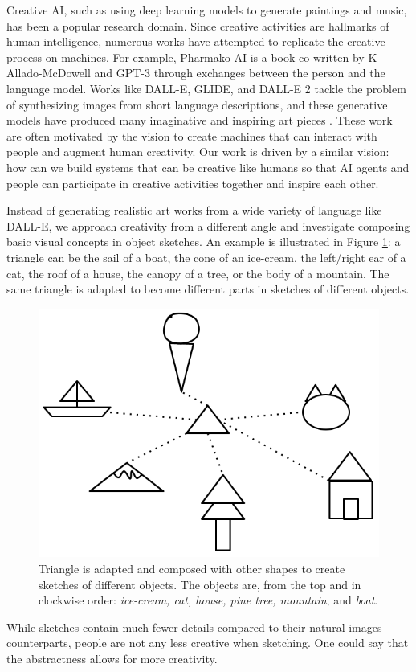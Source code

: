 Creative AI, such as using deep learning models to generate paintings and music, has been a popular research domain.
Since creative activities are hallmarks of human intelligence, numerous works have attempted to replicate the creative process on machines.
For example, Pharmako-AI \citep{allado-mcdowell_okojie_2020} is a book co-written by K Allado-McDowell and GPT-3 \citep{gpt3} through exchanges between the person and the language model. 
Works like DALL-E, GLIDE, and DALL-E 2 tackle the problem of synthesizing images from short language descriptions, and these generative models have produced many imaginative and inspiring art pieces \citep{dallePaper,glidePaper,dalle2Paper}.
These work are often motivated by the vision to create machines that can interact with people and augment human creativity.  
Our work is driven by a similar vision: how can we build systems that can be creative like humans so that AI agents and people can participate in creative activities together and inspire each other. 

Instead of generating realistic art works from a wide variety of language like DALL-E, we approach creativity from a different angle and investigate composing basic visual concepts in object sketches.
An example is illustrated in Figure \ref{introduction.composition}: a triangle can be the sail of a boat, the cone of an ice-cream, the left/right ear of a cat, the roof of a house, the canopy of a tree, or the body of a mountain. The same triangle is adapted to become different parts in sketches of different objects. 
\begin{figure}[h!]
\centering
\includegraphics[width=.3\linewidth]{introduction/sketch_composition.png}  
\caption{Triangle is adapted and composed with other shapes to create sketches of different objects. The objects are, from the top and in clockwise order: \textit{ice-cream, cat, house, pine tree, mountain}, and \textit{boat}.}
\label{introduction.composition}
\end{figure}
While sketches contain much fewer details compared to their natural images counterparts, people are not any less creative when sketching. One could say that the abstractness allows for more creativity. 

